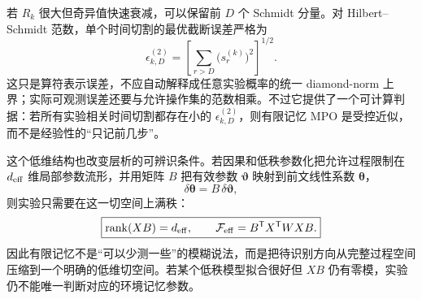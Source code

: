 若 $R_k$ 很大但奇异值快速衰减，可以保留前 $D$ 个 Schmidt 分量。对 Hilbert--Schmidt 范数，单个时间切割的最优截断误差严格为
\begin{equation}
\boxed{
\epsilon_{k,D}^{(2)}
=
\left[
\sum_{r>D}
\bigl(s_r^{(k)}\bigr)^2
\right]^{1/2}.}
\label{eq:process_tensor_schmidt_truncation_error}
\end{equation}
这只是算符表示误差，不应自动解释成任意实验概率的统一 diamond-norm 上界；实际可观测误差还要与允许操作集的范数相乘。不过它提供了一个可计算判据：若所有实验相关时间切割都存在小的 $\epsilon_{k,D}^{(2)}$，则有限记忆 MPO 是受控近似，而不是经验性的“只记前几步”。

这个低维结构也改变层析的可辨识条件。若因果和低秩参数化把允许过程限制在 $d_{\rm eff}$ 维局部参数流形，并用矩阵 $B$ 把有效参数 $\boldsymbol\vartheta$ 映射到前文线性系数 $\boldsymbol\theta$，
\[
\delta\boldsymbol\theta=B\,\delta\boldsymbol\vartheta,
\]
则实验只需要在这一切空间上满秩：
\begin{equation}
\boxed{
\operatorname{rank}(XB)=d_{\rm eff},
\qquad
\mathcal F_{\rm eff}
=
B^{\mathsf T}X^{\mathsf T}WXB.}
\label{eq:process_tensor_lowrank_identifiability}
\end{equation}
因此有限记忆不是“可以少测一些”的模糊说法，而是把待识别方向从完整过程空间压缩到一个明确的低维切空间。若某个低秩模型拟合很好但 $XB$ 仍有零模，实验仍不能唯一判断对应的环境记忆参数。


